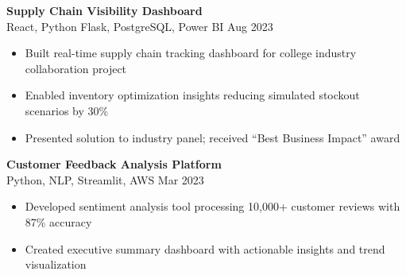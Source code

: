 \documentclass[10pt,a4paper]{article}
\begin{document}
\begin{minipage}[t]{0.67\textwidth}
{\footnotesize\bfseries Supply Chain Visibility Dashboard}\\
{\tiny React, Python Flask, PostgreSQL, Power BI \hfill Aug 2023}
\begin{itemize}
    \item Built real-time supply chain tracking dashboard for college industry collaboration project
    \item Enabled inventory optimization insights reducing simulated stockout scenarios by 30\%
    \item Presented solution to industry panel; received ``Best Business Impact'' award
\end{itemize}

{\footnotesize\bfseries Customer Feedback Analysis Platform}\\
{\tiny Python, NLP, Streamlit, AWS \hfill Mar 2023}
\begin{itemize}
    \item Developed sentiment analysis tool processing 10,000+ customer reviews with 87\% accuracy
    \item Created executive summary dashboard with actionable insights and trend visualization
\end{itemize}

\end{minipage}
\end{document}
